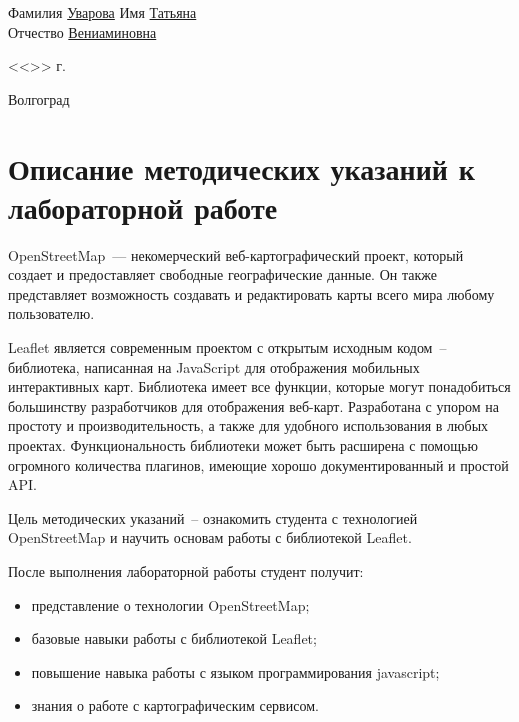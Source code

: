 \documentclass[a4paper, 14pt]{extreport}
\begin{document}
\begin{titlepage}
\begin{flushleft}
            Фамилия \underline{Уварова\hspace{3.15cm}} Имя \underline{Татьяна\hspace{4.85cm}}\\
            Отчество \underline{Вениаминовна\hspace{1.65cm}}
        \end{flushleft}
        \vspace{1.5cm}
        \begin{flushright}
            <<\underline{\hspace{1.0cm}}>>\underline{\hspace{4.0cm}} \the\year г.
        \end{flushright}
        \vspace{\fill}
        \begin{center}
            Волгоград \the\year
        \end{center}
    \end{titlepage}
    \tableofcontents
    \onehalfspacing
    \chapter{Описание методических указаний к лабораторной работе}
    OpenStreetMap~--- некомерческий веб-картографический проект, который
    создает и предоставляет свободные географические данные. Он также
    представляет возможность создавать и редактировать карты всего мира
    любому пользователю.

    Leaflet является современным проектом с открытым исходным кодом~--
    библиотека, написанная на JavaScript для отображения мобильных
    интерактивных карт. Библиотека имеет все функции, которые могут
    понадобиться большинству разработчиков для отображения веб-карт.
    Разработана с упором на простоту и производительность, а также для удобного
    использования в любых проектах. Функциональность библиотеки может быть
    расширена с помощью огромного количества плагинов, имеющие хорошо
    документированный и простой API.

    Цель методических указаний~-- ознакомить студента с технологией \\
    OpenStreetMap и научить основам работы с библиотекой Leaflet.

    После выполнения лабораторной работы студент получит:
    \begin{itemize}
        \item представление о технологии OpenStreetMap;
        \item базовые навыки работы с библиотекой Leaflet;
        \item повышение навыка работы с языком программирования javascript;
        \item знания о работе с картографическим сервисом.
    \end{itemize}
    
\end{document}
